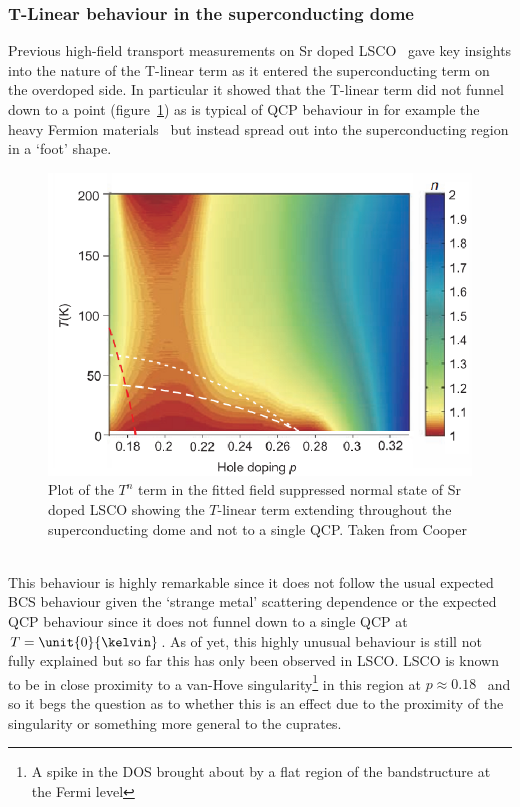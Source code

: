 
\subsubsection{T-Linear behaviour in the superconducting dome}

Previous high-field transport measurements on Sr doped \ac{LSCO}~\cite{Cooper2009} gave key insights into the nature of the T-linear term as it entered the superconducting term on the overdoped side. In particular it showed that the T-linear term did not funnel down to a point (figure~\ref{Fig:Intro:CooperTLinear}) as is typical of \ac{QCP} behaviour in for example the heavy Fermion materials~\cite{Custers2003} but instead spread out into the superconducting region in a `foot' shape.
\begin{figure}[htbp]
    \begin{center}
        \includegraphics[scale=0.9]{Chapter-Introduction/Figures/CooperTLinear/CooperTLinear}
        \caption{Plot of the $T^n$ term in the fitted field suppressed normal state of Sr doped \ac{LSCO} showing the $T$-linear term extending throughout the superconducting dome and not to a single \ac{QCP}. Taken from Cooper \etal~\cite{Cooper2009}}
        \label{Fig:Intro:CooperTLinear}
    \end{center}
\end{figure}
This behaviour is highly remarkable since it does not follow the usual expected \ac{BCS} behaviour given the `strange metal' scattering dependence or the expected \ac{QCP} behaviour since it does not funnel down to a single \ac{QCP} at $T=\unit{0}{\kelvin}$. As of yet, this highly unusual behaviour is still not fully explained but so far this has only been observed in \ac{LSCO}. \ac{LSCO} is known to be in close proximity to a van-Hove singularity\footnote{A spike in the \ac{DOS} brought about by a flat region of the bandstructure at the Fermi level} in this region at $p\approx0.18$~\cite{Hashimoto2008} and so it begs the question as to whether this is an effect due to the proximity of the singularity or something more general to the cuprates.

